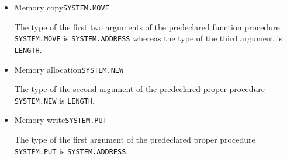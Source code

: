 \begin{itemize}
\item Memory copy\alignright\texttt{SYSTEM.MOVE}\nopagebreak

The type of the first two arguments of the predeclared function procedure \texttt{SYSTEM.MOVE} is \texttt{SYSTEM.AD\-DRESS} whereas the type of the third argument is \texttt{LENGTH}.

\item Memory allocation\alignright\texttt{SYSTEM.NEW}\nopagebreak

The type of the second argument of the predeclared proper procedure \texttt{SYSTEM.NEW} is \texttt{LENGTH}.

\item Memory write\alignright\texttt{SYSTEM.PUT}\nopagebreak

The type of the first argument of the predeclared proper procedure \texttt{SYSTEM.PUT} is \texttt{SYSTEM.AD\-DRESS}.

\end{itemize}


